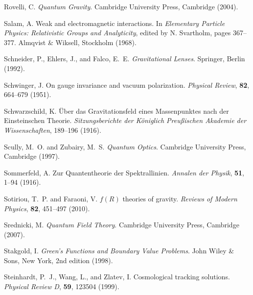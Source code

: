 \documentclass[12pt,a4paper]{article}
\begin{document}
\begin{thebibliography}{99}
		Rovelli, C.
		\newblock \textit{Quantum Gravity}.
		\newblock Cambridge University Press, Cambridge (2004).
		
		Salam, A.
		\newblock Weak and electromagnetic interactions.
		\newblock In \textit{Elementary Particle Physics: Relativistic Groups and Analyticity}, edited by N. Svartholm, pages 367--377. Almqvist \& Wiksell, Stockholm (1968).
		
		Schneider, P., Ehlers, J., and Falco, E.~E.
		\newblock \textit{Gravitational Lenses}.
		\newblock Springer, Berlin (1992).
		
		Schwinger, J.
		\newblock On gauge invariance and vacuum polarization.
		\newblock \textit{Physical Review}, \textbf{82}, 664--679 (1951).
		\newblock {}
		
		Schwarzschild, K.
		\newblock Über das Gravitationsfeld eines Massenpunktes nach der Einsteinschen Theorie.
		\newblock \textit{Sitzungsberichte der Königlich Preußischen Akademie der Wissenschaften}, 189--196 (1916).
		
		Scully, M.~O. and Zubairy, M.~S.
		\newblock \textit{Quantum Optics}.
		\newblock Cambridge University Press, Cambridge (1997).
		
		Sommerfeld, A.
		\newblock Zur Quantentheorie der Spektrallinien.
		\newblock \textit{Annalen der Physik}, \textbf{51}, 1--94 (1916).
		\newblock {}
		
		Sotiriou, T.~P. and Faraoni, V.
		\newblock $f(R)$ theories of gravity.
		\newblock \textit{Reviews of Modern Physics}, \textbf{82}, 451--497 (2010).
		\newblock {}
		
		Srednicki, M.
		\newblock \textit{Quantum Field Theory}.
		\newblock Cambridge University Press, Cambridge (2007).
		
		Stakgold, I.
		\newblock \textit{Green's Functions and Boundary Value Problems}.
		\newblock John Wiley \& Sons, New York, 2nd edition (1998).
		
		Steinhardt, P.~J., Wang, L., and Zlatev, I.
		\newblock Cosmological tracking solutions.
		\newblock \textit{Physical Review D}, \textbf{59}, 123504 (1999).
		\newblock {}
		

\end{thebibliography}
\end{document}
